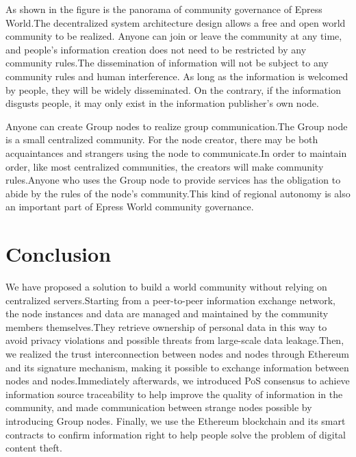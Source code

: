 \documentclass{article}
\begin{document}
    As shown in the figure is the panorama of community governance of Epress World.The decentralized system architecture design allows a free and open world community to be realized. Anyone can join or leave the community at any time, and people's information creation does not need to be restricted by any community rules.The dissemination of information will not be subject to any community rules and human interference. As long as the information is welcomed by people, they will be widely disseminated. On the contrary, if the information disgusts people, it may only exist in the information publisher's own node.
    
    Anyone can create Group nodes to realize group communication.The Group node is a small centralized community. For the node creator, there may be both acquaintances and strangers using the node to communicate.In order to maintain order, like most centralized communities, the creators will make community rules.Anyone who uses the Group node to provide services has the obligation to abide by the rules of the node's community.This kind of regional autonomy is also an important part of Epress World community governance.
\section{Conclusion}
    We have proposed a solution to build a world community without relying on centralized servers.Starting from a peer-to-peer information exchange network, the node instances and data are managed and maintained by the community members themselves.They retrieve ownership of personal data in this way to avoid privacy violations and possible threats from large-scale data leakage.Then, we realized the trust interconnection between nodes and nodes through Ethereum and its signature mechanism, making it possible to exchange information between nodes and nodes.Immediately afterwards, we introduced PoS consensus to achieve information source traceability to help improve the quality of information in the community, and made communication between strange nodes possible by introducing Group nodes. Finally, we use the Ethereum blockchain and its smart contracts to confirm information right to help people solve the problem of digital content theft.
\end{document}
